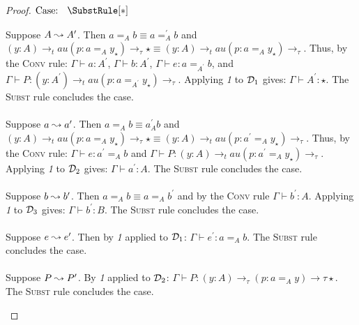 \begin{proof}
    $\text{Case: }\begin{array}{c} \SubstRule[*] \end{array}$
    \begin{proofcase}
        Suppose $A \leadsto A^\prime$.
        Then $a =_A b \equiv a =_A^\prime b$ and $(y : A) \to_tau (p : a =_A y_\star) \to_\tau \star \equiv (y : A) \to_tau (p : a =_A y_\star) \to_\tau$.
        Thus, by the \textsc{Conv} rule: $\Gamma \vdash a : A^\prime$, $\Gamma \vdash b : A^\prime$, $\Gamma \vdash e : a =_{A^\prime} b$, and $\Gamma \vdash P : (y : A^\prime) \to_tau (p : a =_{A^\prime} y_\star) \to_\tau$.
        Applying \textit{1} to $\mathcal{D}_{1}$ gives: $\Gamma \vdash A^\prime : \star$.
        The \textsc{Subst} rule concludes the case.
        \\ \\
        Suppose $a \leadsto a^\prime$.
        Then $a =_A b \equiv a^\prime _A b$ and $(y : A) \to_tau (p : a =_A y_\star) \to_\tau \star \equiv (y : A) \to_tau (p : a^\prime =_A y_\star) \to_\tau$.
        Thus, by the \textsc{Conv} rule: $\Gamma \vdash e : a^\prime =_A b$ and $\Gamma \vdash P : (y : A) \to_tau (p : a^\prime =_A y_\star) \to_\tau$.
        Applying \textit{1} to $\mathcal{D}_{2}$ gives: $\Gamma \vdash a^\prime : A$.
        The \textsc{Subst} rule concludes the case.
        \\ \\
        Suppose $b \leadsto b^\prime$.
        Then $a =_A b \equiv a =_A b^\prime$ and by the \textsc{Conv} rule $\Gamma \vdash b^\prime : A$.
        Applying \textit{1} to $\mathcal{D}_{3}$ gives: $\Gamma \vdash b^\prime : B$.
        The \textsc{Subst} rule concludes the case.
        \\ \\
        Suppose $e \leadsto e^\prime$.
        Then by \textit{1} applied to $\mathcal{D}_{1}$: $\Gamma \vdash e^\prime : a =_A b$.
        The \textsc{Subst} rule concludes the case.
        \\ \\
        Suppose $P \leadsto P^\prime$.
        By \textit{1} applied to $\mathcal{D}_{2}$: $\Gamma \vdash P : (y : A) \to_\tau (p : a =_A y) \to\tau \star$.
        The \textsc{Subst} rule concludes the case.
    \end{proofcase}


\end{proof}
